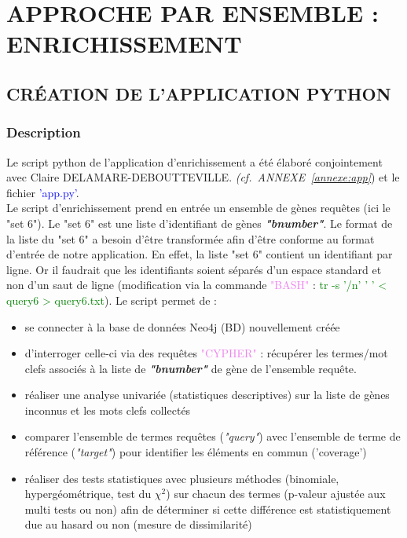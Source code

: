 \documentclass[a4paper,11pt,openright]{report}
\begin{document}
\chapter{APPROCHE PAR ENSEMBLE : ENRICHISSEMENT}
\thispagestyle{empty}
\clearpage
\newpage

	\section{CRÉATION DE L'APPLICATION PYTHON}
		\subsection{Description}
Le script python de l'application d’enrichissement a été élaboré conjointement avec Claire DELAMARE-DEBOUTTEVILLE. \textit{(cf.~ANNEXE~\ref{annexe:app}}) et le fichier \textcolor{blue}{'app.py'}. \\
Le script d’enrichissement prend en entrée un ensemble de gènes requêtes (ici le "set 6"). Le "set 6" est une liste d'identifiant de gènes \textbf{\textit{"bnumber"}}. Le format de la liste du "set 6" a besoin d'être transformée afin d'être conforme au format d'entrée de notre application. En effet, la liste "set 6" contient un identifiant par ligne. Or il faudrait que les identifiants soient séparés d'un espace standard et non d'un saut de ligne (modification via la commande \textcolor{violet}{"BASH"} : \textcolor{green}{tr -s '/n' ' ' < query6 > query6.txt}). Le script permet de :
\begin{itemize}
	\item se connecter à la base de données Neo4j (BD) nouvellement créée
	\item d'interroger celle-ci via des requêtes \textcolor{violet}{"CYPHER"} : récupérer les termes/mot clefs associés à la liste de \textbf{\textit{"bnumber"}} de gène de l'ensemble requête.
	\item réaliser une analyse univariée  (statistiques descriptives) sur la liste de gènes inconnus et les mots clefs collectés
	\item comparer l'ensemble de termes requêtes (\textit{"query"}) avec l'ensemble de terme de référence (\textit{"target"}) pour identifier les éléments en commun ('coverage')
	\item réaliser des tests statistiques avec plusieurs méthodes (binomiale, hypergéométrique, test du $\chi^2$) sur chacun des termes (p-valeur ajustée aux multi tests ou non) afin de déterminer si cette différence est statistiquement due au hasard ou non (mesure de dissimilarité)
\end{itemize}
\end{document}
